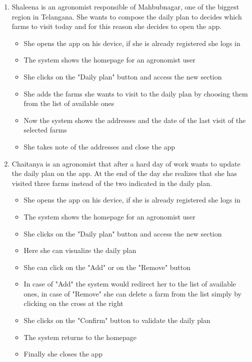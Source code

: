 \documentclass[table, 12pt]{article}
\begin{document}
\begin{enumerate}
    \item Shaleena is an agronomist responsible of Mahbubnagar, one of the biggest region in Telangana.
    She wants to compose the daily plan to decides which farms to visit today and for this reason she decides to open the app.
    \begin{itemize}
        \item She opens the app on his device, if she is already registered she logs in
        \item The system shows the homepage for an agronomist user
        \item She clicks on the "Daily plan" button and access the new section
        \item She adds the farms she wants to visit to the daily plan by choosing them from the list of available ones
        \item Now the system shows the addresses and the date of the last visit of the selected farms
        \item She takes note of the addresses and close the app
    \end{itemize}
    \item Chaitanya is an agronomist that after a hard day of work wants to update the daily plan on the app.
    At the end of the day she realizes that she has visited three farms instead of the two indicated in the daily plan.
    \begin{itemize}
        \item She opens the app on his device, if she is already registered she logs in
        \item The system shows the homepage for an agronomist user
        \item She clicks on the "Daily plan" button and access the new section
        \item Here she can visualize the daily plan
        \item She can click on the "Add" or on the "Remove" button
        \item In case of "Add" the system would redirect her to the list of available ones, in case of "Remove" she can delete a farm 
        from the list simply by clicking on the cross at the right
        \item She clicks on the "Confirm" button to validate the daily plan
        \item The system returns to the homepage
        \item Finally she closes the app
    \end{itemize}
    

\end{enumerate}
\end{document}
